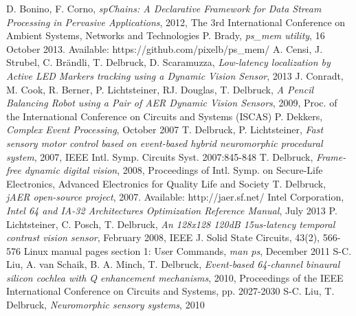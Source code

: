 \documentclass[a4paper,12pt]{report}
\begin{document}
\begin{thebibliography}{99}
 D. Bonino, F. Corno, \emph{spChains: A Declarative Framework for Data Stream Processing in Pervasive Applications}, 2012, The 3rd International Conference on Ambient Systems, Networks and Technologies
 P. Brady, \emph{ps\_mem utility}, 16 October 2013. Available: https://github.com/pixelb/ps\_mem/
 A. Censi, J. Strubel, C. Brändli, T. Delbruck, D. Scaramuzza, \emph{Low-latency localization by Active LED Markers tracking using a Dynamic Vision Sensor}, 2013
 J. Conradt, M. Cook, R. Berner, P. Lichtsteiner, RJ. Douglas, T. Delbruck, \emph{A Pencil Balancing Robot using a Pair of AER Dynamic Vision Sensors}, 2009, Proc. of the International Conference on Circuits and Systems (ISCAS)
 P. Dekkers, \emph{Complex Event Processing}, October 2007
 T. Delbruck, P. Lichtsteiner, \emph{Fast sensory motor control based on event-based hybrid neuromorphic procedural system}, 2007, IEEE Intl. Symp. Circuits Syst. 2007:845-848
 T. Delbruck, \emph{Frame-free dynamic digital vision}, 2008, Proceedings of Intl. Symp. on Secure-Life Electronics, Advanced Electronics for Quality Life and Society
 T. Delbruck, \emph{jAER open-source project}, 2007. Available: http://jaer.sf.net/
 Intel Corporation, \emph{Intel 64 and IA-32 Architectures Optimization Reference Manual}, July 2013
 P. Lichtsteiner, C. Posch, T. Delbruck, \emph{An 128x128 120dB 15us-latency temporal contrast vision sensor}, February 2008, IEEE J. Solid State Circuits, 43(2), 566-576
 Linux manual pages section 1: User Commands, \emph{man ps}, December 2011
 S-C. Liu, A. van Schaik, B. A. Minch, T. Delbruck, \emph{Event-based 64-channel binaural silicon cochlea with Q enhancement mechanisms}, 2010, Proceedings of the IEEE International Conference on Circuits and Systems, pp. 2027-2030
 S-C. Liu, T. Delbruck, \emph{Neuromorphic sensory systems}, 2010
\end{thebibliography}
\end{document}
